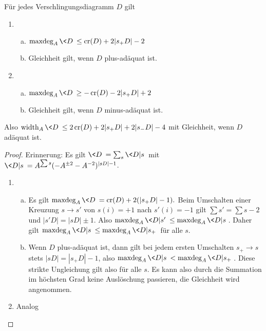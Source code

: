 \begin{lem}[A]
    Für jedes Verschlingungsdiagramm $D$ gilt
    \begin{enumerate}[1)]
        \item
            \begin{enumerate}[a)]
                \item
                    $\maxdeg_A \<D\> \le \Cr(D) + 2 |s_+ D| - 2$
                \item
                    Gleichheit gilt, wenn $D$ plus-adäquat ist.
            \end{enumerate}
        \item
            \begin{enumerate}[a)]
                \item
                    $\maxdeg_A \<D\> \ge -\Cr(D) - 2 |s_+ D| + 2$
                \item
                    Gleichheit gilt, wenn $D$ minus-adäquat ist.
            \end{enumerate}
    \end{enumerate}
    Also
    \begin{math}
        \width_A \<D\>  \le 2 \Cr(D) + 2 |s_+ D| + 2|s_- D| - 4
    \end{math}
    mit Gleichheit, wenn $D$ adäquat ist.
    \begin{proof}
        Erinnerung: Es gilt $\<D\> = \sum_s \<D|s\>$ mit $\<D|s\> = A^{\sum s} (-A^{\pm 2} - A^{-2})^{|sD| - 1}$.
        \begin{enumerate}[1)]
            \item
                \begin{enumerate}[a)]
                    \item
                        Es gilt
                        \begin{math}
                            \maxdeg_A \<D\> = \Cr(D) + 2(|s_+ D| - 1).
                        \end{math}
                        Beim Umschalten einer Kreuzung $s \to s'$ von $s(i) = +1$ nach $s'(i) = -1$ gilt $\sum s' = \sum s - 2$ und $|s' D| = |sD| \pm 1$.
                        Also $\maxdeg_A \<D|s'\> \le \maxdeg_A \<D|s\>$.
                        Daher gilt $\maxdeg_A \<D|s\> \le \maxdeg_A \<D|s_+\>$ für alle $s$.
                    \item
                        Wenn $D$ plus-adäquat ist, dann gilt bei jedem ersten Umschalten $s_+ \to s$ stets $|sD| = |s_+D| - 1$, also $\maxdeg_A \<D|s\> < \maxdeg_A \<D|s_+\>$.
                        Diese strikte Ungleichung gilt also für alle $s$.
                        Es kann also durch die Summation im höchsten Grad keine Auslöschung passieren, die Gleichheit wird angenommen.
                \end{enumerate}
            \item
                Analog
        \end{enumerate}
    \end{proof}
\end{lem}

